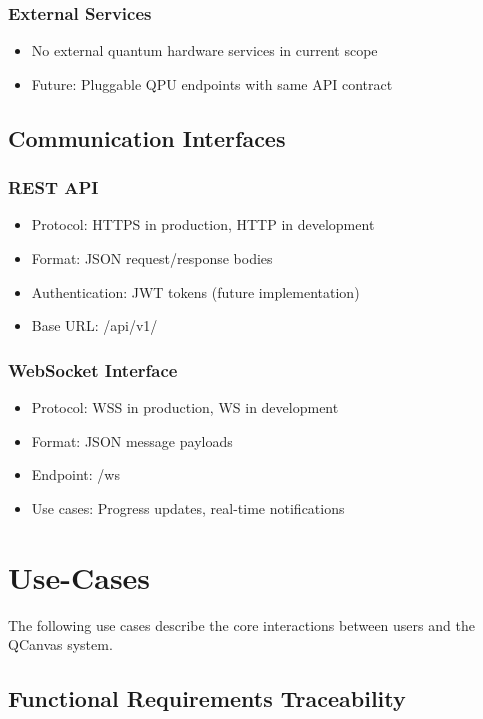 \subsubsection{External Services}
\begin{itemize}
    \item No external quantum hardware services in current scope
    \item Future: Pluggable QPU endpoints with same API contract
\end{itemize}

\subsection{Communication Interfaces}

\subsubsection{REST API}
\begin{itemize}
    \item Protocol: HTTPS in production, HTTP in development
    \item Format: JSON request/response bodies
    \item Authentication: JWT tokens (future implementation)
    \item Base URL: /api/v1/
\end{itemize}

\subsubsection{WebSocket Interface}
\begin{itemize}
    \item Protocol: WSS in production, WS in development
    \item Format: JSON message payloads
    \item Endpoint: /ws
    \item Use cases: Progress updates, real-time notifications
\end{itemize}

\clearpage
\section{Use-Cases}

The following use cases describe the core interactions between users and the QCanvas system.

\subsection{Functional Requirements Traceability}

